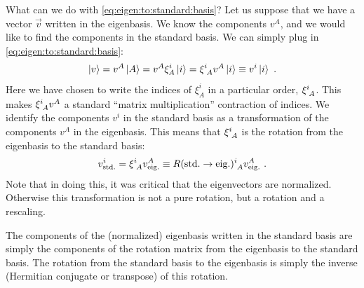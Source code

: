 \documentclass[12pt, oneside]{report}    %
\begin{document}
What can we do with \eqref{eq:eigen:to:standard:basis}? Let us suppose that we have a vector $\vec{v}$ written in the eigenbasis. We know the components $v^A$, and we would like to find the components in the standard basis. We can simply plug in \eqref{eq:eigen:to:standard:basis}:
\begin{align}
    \ket{v} = 
    v^A\ket{A}
    = v^A \xi_A^i \ket{i} =  \xi\aij{i}{A}v^A \ket{i}
    \equiv v^i \ket{i} \ .
    \label{eq:vA:as:vi}
\end{align}
Here we have chosen to write the indices of $\xi^i_A$ in a particular order, $\xi\aij{i}{A}$. This makes $\xi\aij{i}{A}v^A$ a standard ``matrix multiplication'' contraction of indices. We identify the components $v^i$ in the standard basis as a transformation of the components $v^A$ in the eigenbasis. This means that $\xi\aij{i}{A}$ is the rotation from the eigenbasis to the standard basis:
\begin{align}
    v^i_\text{std.} = \xi\aij{i}{A}v^A_\text{eig.} \equiv R(\text{std.}\to\text{eig.})\aij{i}{A}v^A_\text{eig.} \ .
\end{align}
Note that in doing this, it was critical that the eigenvectors are normalized. Otherwise this transformation is not a pure rotation, but a rotation and a rescaling. 

\begin{bigidea}
The components of the (normalized) eigenbasis written in the standard basis are simply the components of the rotation matrix from the eigenbasis to the standard basis. The rotation from the standard basis to the eigenbasis is simply the inverse (Hermitian conjugate or transpose) of this rotation. 
\end{bigidea}
\end{document}
